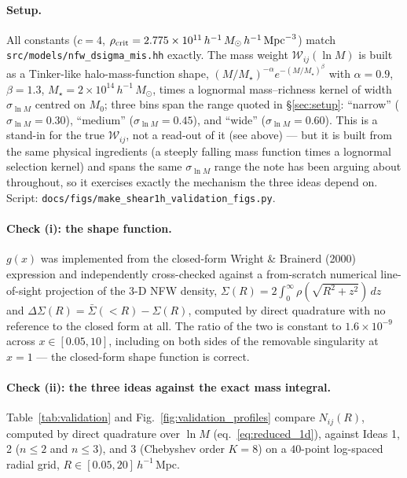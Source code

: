 \documentclass[a4paper, 11pt]{article}
\newcommand{\hMpc}{h^{-1}\,\mathrm{Mpc}}
\newcommand{\hMsun}{h^{-1}\,M_{\odot}}
\newcommand{\lnM}{\ln M}
\newcommand{\Wcal}{\mathcal{W}}
\begin{document}
\paragraph{Setup.} All constants ($c=4$, $\rho_{\rm crit}=2.775\times
10^{11}\,\hMsun\,\hMpc^{-3}$) match
\texttt{src/models/nfw\_dsigma\_mis.hh} exactly. The mass weight
$\Wcal_{ij}(\lnM)$ is built as a Tinker-like halo-mass-function shape,
$(M/M_\star)^{-\alpha}e^{-(M/M_\star)^\beta}$ with $\alpha=0.9$,
$\beta=1.3$, $M_\star=2\times10^{14}\,\hMsun$, times a lognormal
mass--richness kernel of width $\sigma_{\lnM}$ centred on $M_0$; three
bins span the range quoted in \S\ref{sec:setup}: ``narrow''
($\sigma_{\lnM}=0.30$), ``medium'' ($\sigma_{\lnM}=0.45$), and
``wide'' ($\sigma_{\lnM}=0.60$). This is a stand-in for the true
$\Wcal_{ij}$, not a read-out of it (see above) --- but it is built
from the same physical ingredients (a steeply falling mass function
times a lognormal selection kernel) and spans the same
$\sigma_{\lnM}$ range the note has been arguing about throughout, so
it exercises exactly the mechanism the three ideas depend on. Script:
\texttt{docs/figs/make\_shear1h\_validation\_figs.py}.

\paragraph{Check (i): the shape function.} $g(x)$ was implemented
from the closed-form Wright \& Brainerd (2000) expression and
independently cross-checked against a from-scratch numerical
line-of-sight projection of the 3-D NFW density,
$\Sigma(R)=2\int_0^\infty\!\rho(\sqrt{R^2+z^2})\,dz$ and
$\Delta\Sigma(R)=\bar\Sigma(<R)-\Sigma(R)$, computed by direct
quadrature with no reference to the closed form at all. The ratio of
the two is constant to $1.6\times10^{-9}$ across
$x\in[0.05,10]$, including on both sides of the removable
singularity at $x=1$ --- the closed-form shape function is correct.

\paragraph{Check (ii): the three ideas against the exact mass
integral.} Table~\ref{tab:validation} and
Fig.~\ref{fig:validation_profiles} compare $N_{ij}(R)$, computed by
direct quadrature over $\lnM$ (eq.~\ref{eq:reduced_1d}), against
Ideas 1, 2 ($n\le2$ and $n\le3$), and 3 (Chebyshev order $K=8$) on a
$40$-point log-spaced radial grid, $R\in[0.05,20]\,\hMpc$.
\end{document}
